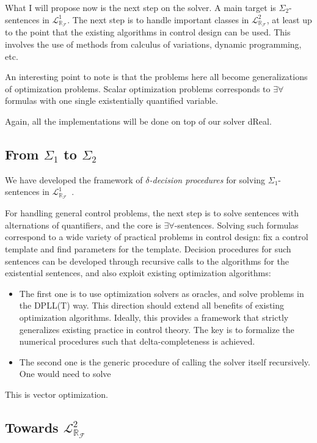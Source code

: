 \documentclass[10pt]{article}
\newcommand{\lrf}{\mathcal{L}_{\mathbb{R}_{\mathcal{F}}}}
\theoremstyle{definition}
\begin{document}
What I will propose now is the next step on the solver. A main target is $\Sigma_2$-sentences in $\lrf^1$. The next step is to handle important classes in $\lrf^2$, at least up to the point that the existing algorithms in control design can be used. This involves the use of methods from calculus of variations, dynamic programming, etc. 

An interesting point to note is that the problems here all become generalizations of optimization problems. Scalar optimization problems corresponds to $\exists\forall$ formulas with one single existentially quantified variable. 

Again, all the implementations will be done on top of our solver dReal. 

\subsection{From $\Sigma_1$ to $\Sigma_2$} 

We have developed the framework of {\em $\delta$-decision procedures} for solving $\Sigma_1$-sentences in $\lrf^1$~\cite{DBLP:conf/cade/GaoAC12}. 

For handling general control problems, the next step is to solve sentences with alternations of quantifiers, and the core is $\exists\forall$-sentences. Solving such formulas correspond to a wide variety of practical problems in control design: fix a control template and find parameters for the template. Decision procedures for such sentences can be developed through recursive calls to the algorithms for the existential sentences, and also exploit existing optimization algorithms:
\begin{itemize}
\item The first one is to use optimization solvers as oracles, and solve problems in the DPLL(T) way. This direction should extend all benefits of existing optimization algorithms. Ideally, this provides a framework that strictly generalizes existing practice in control theory. The key is to formalize the numerical procedures such that delta-completeness is achieved. 
\item The second one is the generic procedure of calling the solver itself recursively. One would need to solve 
\end{itemize}

This is vector optimization.  

\subsection{Towards $\lrf^2$} 
\end{document}
